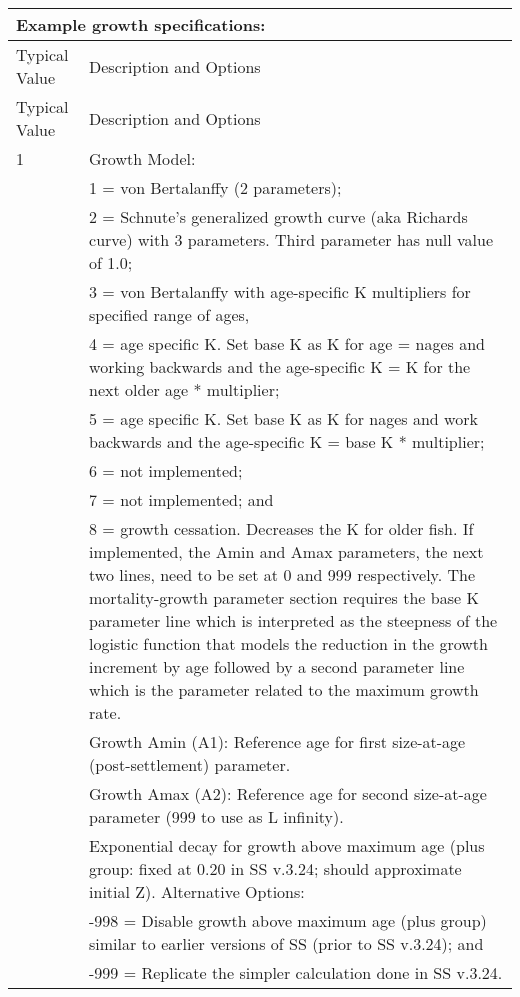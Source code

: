 	
\begin{longtable}{p{0.5cm} p{2cm} p{12cm}}
	\multicolumn{3}{l}{Example growth specifications:} \Tstrut\Bstrut\\
	\hline	
	\multicolumn{2}{l}{Typical Value} & Description and Options\Tstrut\Bstrut\\
	\hline
	\endfirsthead

	\hline
	\multicolumn{2}{l}{Typical Value} & Description and Options\Tstrut\Bstrut\\
	\hline
	\endhead
	\hline

	\endfoot
	
	\endlastfoot

	1 & & Growth Model: \Tstrut\\
	  & & 1 = von Bertalanffy (2 parameters);\\
	  & & 2 = Schnute's generalized growth curve (aka Richards curve) with 3 parameters.  Third parameter has null value of 1.0; \\
	  & & 3 = von Bertalanffy with age-specific K multipliers for specified range of ages,\\
	  & & 4 = age specific K. Set base K as K for age = nages and working backwards and the age-specific K = K for the next older age * multiplier; \\
	  & & 5 = age specific K. Set base K as K for nages and work backwards and the age-specific K = base K * multiplier; \\
	  & & 6 = not implemented; \\
	  & & 7 = not implemented; and \\
	  & & 8 = growth cessation. Decreases the K for older fish. If implemented, the Amin and Amax parameters, the next two lines, need to be set at 0 and 999 respectively. The mortality-growth parameter section requires the base K parameter line which is interpreted as the steepness of the logistic function that models the reduction in the growth increment by age followed by a second parameter line which is the parameter related to the maximum growth rate. \Bstrut \\
	\hline

	\Tstrut 1.66 & & Growth Amin (A1): Reference age for first size-at-age (post-settlement) parameter.\Bstrut\\
	\hline

	\Tstrut 25 & & Growth Amax (A2): Reference age for second size-at-age parameter (999 to use as L infinity).\Bstrut\\
	\hline
	
	\Tstrut 0.20 & & Exponential decay for growth above maximum age (plus group: fixed at 0.20 in SS v.3.24; should approximate initial Z). Alternative Options: \\
			     & & -998 = Disable growth above maximum age (plus group) similar to earlier versions of SS (prior to SS v.3.24); and\\
			     & & -999 = Replicate the simpler calculation done in SS v.3.24.\Bstrut\\
	\hline
	

\end{longtable}
